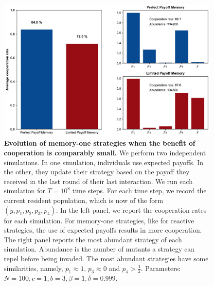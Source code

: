 \documentclass[11pt]{article}
\theoremstyle{plainCl1}
\theoremstyle{plainCl2}
\begin{document}
\begin{figure}[!htbp]
  \centering 
  \includegraphics[width=\textwidth]{static/memory_one_results_low_benefit.pdf}
  \caption{\textbf{Evolution of memory-one strategies when the benefit of cooperation is comparably small.}
  We perform two independent simulations. In one simulation, individuals use
  expected payoffs. 
  In the other, they update their strategy based on the payoff they received in the last round of their last interaction. 
  We run each simulation for \(T = 10^8\) time steps.
  For each time step, we record the current resident population, which is
  now of the form  \((y, p_1, p_2, p_3, p_4)\). In the left panel, we report the
  cooperation rates for each simulation. 
  For memory-one strategies, like for reactive strategies, the use of expected payoffs results in more cooperation. 
  The right panel reports the most abundant strategy of each
  simulation. Abundance is the number of mutants a strategy can repel before
  being invaded. The most abundant strategies have some similarities,
  namely, \(p_1 \approx 1\), \(p_3 \approx 0\) and \(p_4 > \frac{1}{2}\). 
  Parameters: \(N =100, c=1, b=3, \beta=1, \delta=0.999\).}\label{fig:memory_one_low_benefit}
\end{figure}
\end{document}
